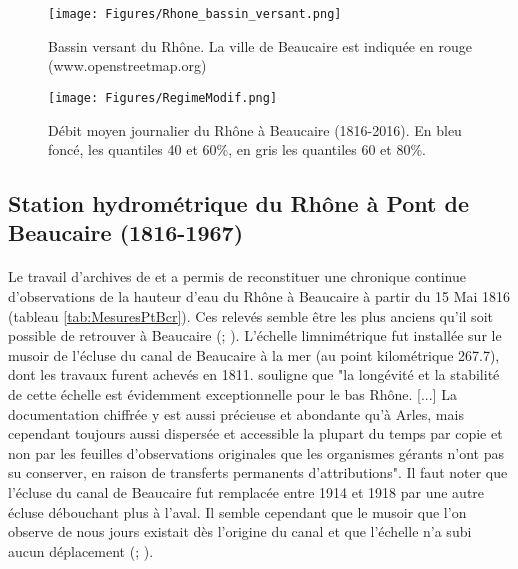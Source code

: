 \documentclass[11pt]{article}
\begin{document}
	\begin{figure}[h]
	\centering
		\texttt{[image: Figures/Rhone\_bassin\_versant.png]}
        \caption{Bassin versant du Rhône. La ville de Beaucaire est indiquée en rouge (www.openstreetmap.org)}	
		\label{fig:BV}
	\end{figure}
	
	\begin{figure}[h]
	\centering
		\texttt{[image: Figures/RegimeModif.png]}
        \caption{Débit moyen journalier du Rhône à Beaucaire (1816-2016). En bleu foncé, les quantiles 40 et 60\%, en gris les quantiles 60 et 80\%.}	
		\label{fig:Regime}
	\end{figure}
	
	
\FloatBarrier

	\subsection{Station hydrométrique du Rhône à Pont de Beaucaire (1816-1967)}
	
	\paragraph{} Le travail d'archives de \citet{pichard_les_1995} et \citet{pichard_hydro-climatology_2017} a permis de reconstituer une chronique continue d'observations de la hauteur d'eau du Rhône à Beaucaire à partir du 15 Mai 1816 (tableau \ref{tab:MesuresPtBcr}). Ces relevés semble être les plus anciens qu'il soit possible de retrouver à Beaucaire (\citet{pichard_les_1995}; \citet{parde_regime_1925}). L'échelle limnimétrique fut installée sur le musoir de l'écluse du canal de Beaucaire à la mer (au point kilométrique 267.7), dont les travaux furent achevés en 1811. \citet{pichard_hauteurs_2013} souligne que "la longévité et la stabilité de cette échelle est évidemment exceptionnelle pour le bas Rhône. [...] La documentation chiffrée y est aussi précieuse et abondante qu'à Arles, mais cependant toujours aussi dispersée et accessible la plupart du temps par copie et non par les feuilles d'observations originales que les organismes gérants n'ont pas su conserver, en raison de transferts permanents d'attributions". Il faut noter que l'écluse du canal de Beaucaire fut remplacée entre 1914 et 1918 par une autre écluse débouchant plus à l'aval. Il semble cependant que le musoir que l'on observe de nous jours existait dès l'origine du canal et que l'échelle n'a subi aucun déplacement (\citet{pichard_hauteurs_2013}; \citet{bard_actualisation_2018}). 
	
\end{document}
